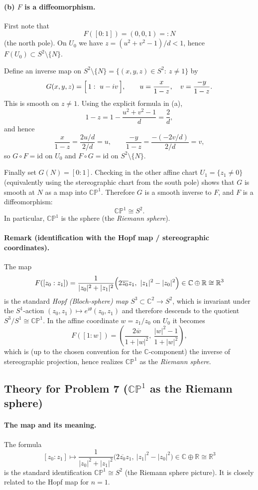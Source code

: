 \documentclass[12pt,a4paper]{article}
\theoremstyle{plain}
\theoremstyle{definition}      %
\begin{document}
\paragraph{(b) $F$ is a diffeomorphism.}
First note that
\[
F([0:1])=(0,0,1)=:N
\]
(the north pole). On $U_0$ we have $z=(u^2+v^2-1)/d<1$, hence $F(U_0)\subset S^2\setminus\{N\}$.

Define an inverse map on $S^2\setminus\{N\}=\{(x,y,z)\in S^2:\ z\neq 1\}$ by
\[
G(x,y,z)=\Bigl[\,1:\ u-iv\,\Bigr],
\qquad
u=\frac{x}{1-z},\quad v=\frac{-y}{1-z}.
\]
This is smooth on $z\neq 1$. Using the explicit formula in (a),
\[
1-z = 1-\frac{u^2+v^2-1}{d}=\frac{2}{d},
\]
and hence
\[
\frac{x}{1-z}=\frac{2u/d}{2/d}=u,\qquad
\frac{-y}{1-z}=\frac{-(-2v/d)}{2/d}=v,
\]
so $G\circ F=\mathrm{id}$ on $U_0$ and $F\circ G=\mathrm{id}$ on $S^2\setminus\{N\}$.

Finally set $G(N)=[0:1]$. Checking in the other affine chart $U_1=\{z_1\neq 0\}$ (equivalently using the
stereographic chart from the south pole) shows that $G$ is smooth at $N$ as a map into $\mathbb{CP}^1$.
Therefore $G$ is a smooth inverse to $F$, and $F$ is a diffeomorphism:
\[
\mathbb{CP}^1 \cong S^2.
\]
In particular, $\mathbb{CP}^1$ is the sphere (the \emph{Riemann sphere}).


\paragraph{\textbf{Remark (identification with the Hopf map / stereographic coordinates).}}
The map
\[
F([z_0:z_1])=\frac{1}{|z_0|^2+|z_1|^2}\Bigl(2\overline{z_0}z_1,\ |z_1|^2-|z_0|^2\Bigr)
\in \mathbb{C}\oplus\mathbb{R}\cong\mathbb{R}^3
\]
is the standard \emph{Hopf (Bloch-sphere) map} $S^3\subset\mathbb{C}^2\to S^2$,
which is invariant under the $S^1$-action $(z_0,z_1)\mapsto e^{i\theta}(z_0,z_1)$ and therefore descends
to the quotient $S^3/S^1\cong \mathbb{CP}^1$. In the affine coordinate $w=z_1/z_0$ on $U_0$ it becomes
\[
F([1:w])=\left(\frac{2\overline{w}}{1+|w|^2},\ \frac{|w|^2-1}{1+|w|^2}\right),
\]
which is (up to the chosen convention for the $\mathbb{C}$-component) the inverse of stereographic projection,
hence realizes $\mathbb{CP}^1$ as the \emph{Riemann sphere}.


\subsection*{Theory for Problem 7 ($\mathbb{CP}^1$ as the Riemann sphere)}

\paragraph{The map and its meaning.}
The formula
\[
[z_0:z_1]\longmapsto
\frac{1}{|z_0|^2+|z_1|^2}\Big(2\overline{z_0}z_1,\ |z_1|^2-|z_0|^2\Big)
\in \mathbb C\oplus\mathbb R\cong\mathbb R^3
\]
is the standard identification $\mathbb{CP}^1\cong S^2$
(the Riemann sphere picture). It is closely related to the Hopf map for $n=1$.
\end{document}
